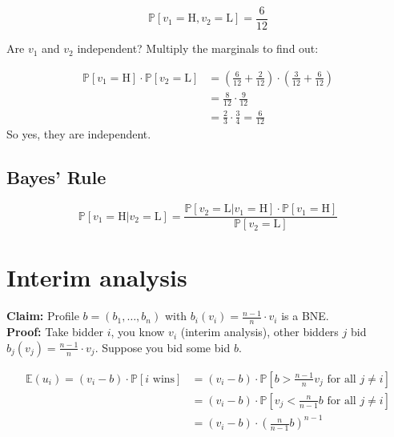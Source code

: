 \documentclass{article}
\begin{document}
\begin{equation*}
    \mathbb{P}[v_1=\text{H}, v_2=\text{L}]=\frac{6}{12}
\end{equation*}

\noindent
Are $v_1$ and $v_2$ independent? Multiply the marginals to find out:

\begin{equation*}
    \begin{aligned}
        \mathbb{P}[v_1=\text{H}]\cdot\mathbb{P}[v_2=\text{L}]&=\left(\frac{6}{12}+\frac{2}{12}\right)\cdot\left(\frac{3}{12}+\frac{6}{12}\right)\\
        &=\frac{8}{12}\cdot\frac{9}{12}\\
        &=\frac{2}{3}\cdot\frac{3}{4}=\frac{6}{12}
    \end{aligned}
\end{equation*}
\noindent
So yes, they are independent.

\subsection*{Bayes' Rule}
\begin{equation*}
    \mathbb{P}[v_1=\text{H}|v_2=\text{L}]=\frac{\mathbb{P}[v_2=\text{L}|v_1=\text{H}]\cdot\mathbb{P}[v_1=\text{H}]}{\mathbb{P}[v_2=\text{L}]}
\end{equation*}

\section*{Interim analysis}
\textbf{Claim:} Profile $b=(b_1,\dots,b_n)$ with $b_i(v_i)=\frac{n-1}{n}\cdot v_i$ is a BNE.\\
\noindent
\textbf{Proof:} Take bidder $i$, you know $v_i$ (interim analysis), other bidders $j$ bid $b_j(v_j)=\frac{n-1}{n}\cdot v_j$. Suppose you bid some bid $b$.

\begin{equation*}
\begin{aligned}
    \mathbb{E}(u_i)=(v_i-b)\cdot\mathbb{P}[i \text{ wins}]&=(v_i-b)\cdot \mathbb{P}\left[b>\frac{n-1}{n}v_j\text{ for all }j\neq i\right]\\
    &=(v_i-b)\cdot\mathbb{P}\left[v_j<\frac{n}{n-1}b\text{ for all } j\neq i\right]\\
    &=(v_i-b)\cdot\left(\frac{n}{n-1}b\right)^{n-1}
\end{aligned}
\end{equation*}
\end{document}
